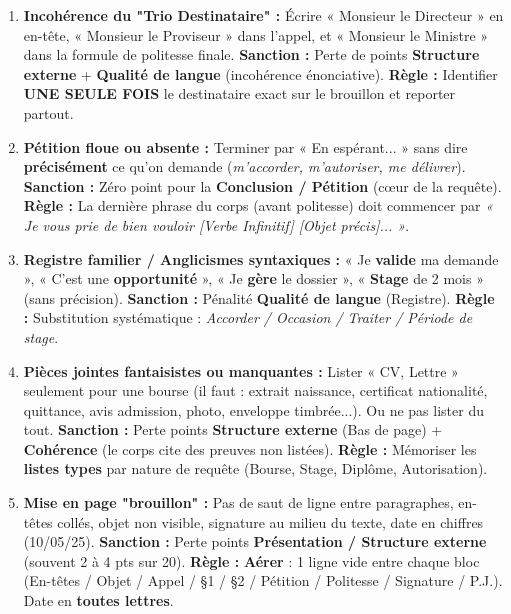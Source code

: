 \documentclass[11pt]{article}
\begin{document}
\begin{attention}
\begin{enumerate}
    \item \textbf{Incohérence du "Trio Destinataire" :} Écrire « Monsieur le Directeur » en en-tête, « Monsieur le Proviseur » dans l'appel, et « Monsieur le Ministre » dans la formule de politesse finale. \textbf{Sanction :} Perte de points \textbf{Structure externe} + \textbf{Qualité de langue} (incohérence énonciative). \textbf{Règle :} Identifier \textbf{UNE SEULE FOIS} le destinataire exact sur le brouillon et reporter partout.
    \item \textbf{Pétition floue ou absente :} Terminer par « En espérant... » sans dire \textbf{précisément} ce qu'on demande (\emph{m'accorder, m'autoriser, me délivrer}). \textbf{Sanction :} Zéro point pour la \textbf{Conclusion / Pétition} (cœur de la requête). \textbf{Règle :} La dernière phrase du corps (avant politesse) doit commencer par \emph{« Je vous prie de bien vouloir [Verbe Infinitif] [Objet précis]... »}.
    \item \textbf{Registre familier / Anglicismes syntaxiques :} « Je \textbf{valide} ma demande », « C'est une \textbf{opportunité} », « Je \textbf{gère} le dossier », « \textbf{Stage} de 2 mois » (sans précision). \textbf{Sanction :} Pénalité \textbf{Qualité de langue} (Registre). \textbf{Règle :} Substitution systématique : \emph{Accorder / Occasion / Traiter / Période de stage}.
    \item \textbf{Pièces jointes fantaisistes ou manquantes :} Lister « CV, Lettre » seulement pour une bourse (il faut : extrait naissance, certificat nationalité, quittance, avis admission, photo, enveloppe timbrée...). Ou ne pas lister du tout. \textbf{Sanction :} Perte points \textbf{Structure externe} (Bas de page) + \textbf{Cohérence} (le corps cite des preuves non listées). \textbf{Règle :} Mémoriser les \textbf{listes types} par nature de requête (Bourse, Stage, Diplôme, Autorisation).
    \item \textbf{Mise en page "brouillon" :} Pas de saut de ligne entre paragraphes, en-têtes collés, objet non visible, signature au milieu du texte, date en chiffres (10/05/25). \textbf{Sanction :} Perte points \textbf{Présentation / Structure externe} (souvent 2 à 4 pts sur 20). \textbf{Règle :} \textbf{Aérer} : 1 ligne vide entre chaque bloc (En-têtes / Objet / Appel / §1 / §2 / Pétition / Politesse / Signature / P.J.). Date en \textbf{toutes lettres}.
\end{enumerate}
\end{attention}
\end{document}
